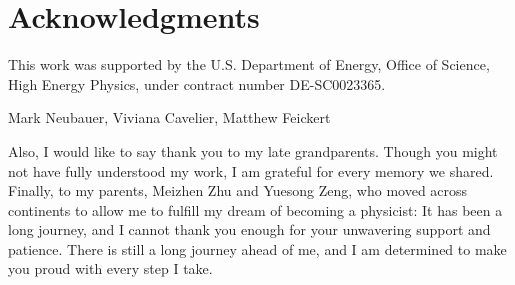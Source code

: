 \chapter*{Acknowledgments}
This work was supported by the U.S. Department of Energy, Office of Science, High Energy Physics, under contract number DE-SC0023365.

Mark Neubauer, Viviana Cavelier, Matthew Feickert

Also, I would like to say thank you to my late grandparents. Though you might not have fully understood my work, I am grateful for every memory we shared. Finally, to my parents, Meizhen Zhu and Yuesong Zeng, who moved across continents to allow me to fulfill my dream of becoming a physicist: It has been a long journey, and I cannot thank you enough for your unwavering support and patience. There is still a long journey ahead of me, and I am determined to make you proud with every step I take.
